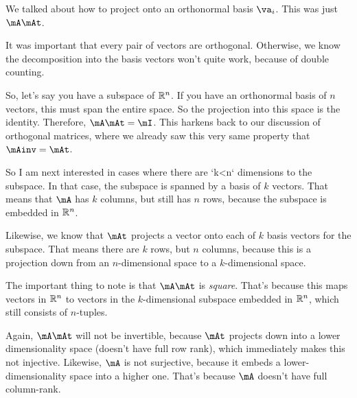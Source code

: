 We talked about how to project onto an orthonormal basis $\va_i$. This
was just $\mA\mAt$.

It was important that every pair of vectors are orthogonal. Otherwise,
we know the decomposition into the basis vectors won't quite work,
because of double counting.

So, let's say you have a subspace of $\mathbb{R}^n$. If you have an orthonormal
basis of $n$ vectors, this must span the entire space. So the projection
into this space is the identity. Therefore, $\mA\mAt=\mI$. This harkens
back to our discussion of orthogonal matrices, where we already saw this
very same property that $\mAinv=\mAt$.

So I am next interested in cases where there are `k<n` dimensions to the
subspace. In that case, the subspace is spanned by a basis of $k$
vectors. That means that $\mA$ has $k$ columns, but still has $n$ rows,
because the subspace is embedded in $\mathbb{R}^n$.

Likewise, we know that $\mAt$ projects a vector onto each of $k$ basis
vectors for the subspace. That means there are $k$ rows, but $n$
columns, because this is a projection down from an $n$-dimensional space
to a $k$-dimensional space.

The important thing to note is that $\mA\mAt$ is \emph{square}. That's
because this maps vectors in $\mathbb{R}^n$ to vectors in the $k$-dimensional
subspace embedded in $\mathbb{R}^n$, which still consists of $n$-tuples.

Again, $\mA\mAt$ will not be invertible, because $\mAt$ projects down
into a lower dimensionality space (doesn't have full row rank), which
immediately makes this not injective. Likewise, $\mA$ is not surjective,
because it embeds a lower-dimensionality space into a higher one. That's
because $\mA$ doesn't have full column-rank.
